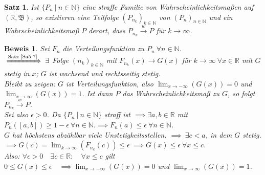 \documentclass[a4paper,11pt]{scrbook}
\newcommand{\R}{{\mathbb R}}
\newcommand{\N}{{\mathbb N}}
\def\BB{ \mathfrak{B} }
\def\folgt{\ensuremath{\implies}}
\newcommand{\folgtnach}[1]{\ensuremath{\DOTSB\;\xRightarrow{\text{#1}}\;}}
\def\wto{\stackrel{w}{\rightarrow}}
\newtheorem{Sa}{Satz}[chapter]
\theoremstyle{nonumberplain}
\newtheorem{Bew}{Beweis}
\begin{document}
\begin{Sa}
Ist $\{P_n\ |\ n\in\N\}$ eine straffe Familie von Wahrscheinlichkeitsmaßen auf $(\R,\BB)$, so existieren eine Teilfolge $(P_{n_k})_{k\in\N}$ von $(P_n)_{n\in\N}$ und ein Wahrscheinlichkeitsmaß $P$ derart, dass $P_{n_k} \wto P$ für $k\to\infty$.
\end{Sa}
\begin{Bew}
Sei $F_n$ die Verteilungsfunktion zu $P_n \ \forall n\in\N$. \\
$\folgtnach{Satz \ref{Sa5.7}} \exists$ Folge $(n_k)_{k\in\N}$ mit $F_{n_k}(x) \to G(x)$ für $k\to\infty \ \forall x\in\R$ mit $G$ stetig in $x$; $G$ ist wachsend und rechtsseitig stetig. \\
Bleibt zu zeigen: $G$ ist Verteilungsfunktion, also $\lim_{x\to -\infty}(G(x)) = 0$ und $\lim_{x\to\infty}(G(x)) = 1$. Ist dann $P$ das Wahrscheinlichkeitsmaß zu $G$, so folgt $P_{n_k} \wto P$. \\
Sei also $\epsilon>0$. Da $\{P_n\ |\ n\in\N\}$ straff ist $\folgt \exists a,b\in\R$ mit $P_n([a,b]) \geq 1-\epsilon \ \forall n\in\N. \folgt F_n(a) \leq \epsilon \ \forall n\in\N$. \\
$G$ hat höchstens abzählbar viele Unstetigkeitsstellen. $\folgt \ \exists c<a$, in dem $G$ stetig. $\folgt G(c) = \lim_{k\to\infty}(F_{n_k}(c)) \leq \epsilon \ \folgt G(x) \leq \epsilon \ \forall x\leq c$. \\
Also: $\forall \epsilon>0 \quad\exists c\in\R: \quad\forall x\leq c$ gilt $0 \leq G(x) \leq \epsilon \quad\folgt \lim_{x\to -\infty}(G(x)) = 0$ und $\lim_{x\to\infty}(G(x)) = 1$.
\end{Bew}
\end{document}
